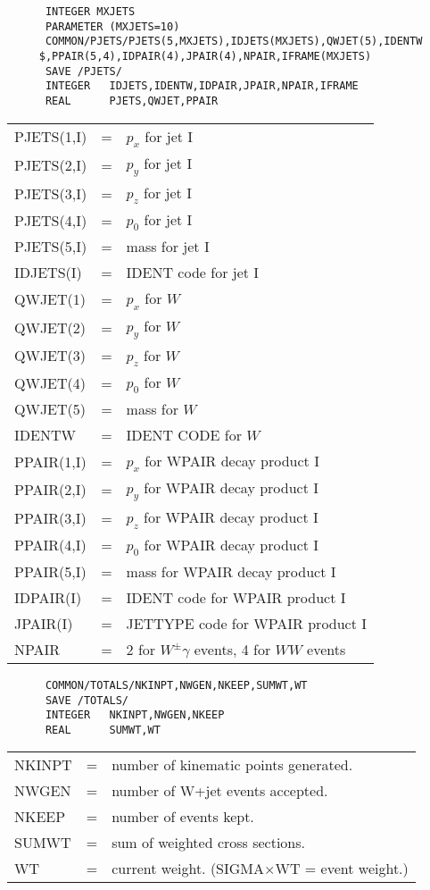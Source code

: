 \begin{verbatim}
      INTEGER MXJETS
      PARAMETER (MXJETS=10)
      COMMON/PJETS/PJETS(5,MXJETS),IDJETS(MXJETS),QWJET(5),IDENTW 
     $,PPAIR(5,4),IDPAIR(4),JPAIR(4),NPAIR,IFRAME(MXJETS)
      SAVE /PJETS/
      INTEGER   IDJETS,IDENTW,IDPAIR,JPAIR,NPAIR,IFRAME
      REAL      PJETS,QWJET,PPAIR
\end{verbatim}
\begin{tabular}{lcl}
PJETS(1,I)         &=& $p_x$ for jet I\\
PJETS(2,I)         &=& $p_y$ for jet I\\
PJETS(3,I)         &=& $p_z$ for jet I\\
PJETS(4,I)         &=& $p_0$ for jet I\\
PJETS(5,I)         &=& mass for jet I\\
IDJETS(I)          &=& IDENT code for jet I\\
QWJET(1)           &=& $p_x$ for $W$\\
QWJET(2)           &=& $p_y$ for $W$\\
QWJET(3)           &=& $p_z$ for $W$\\
QWJET(4)           &=& $p_0$ for $W$\\
QWJET(5)           &=& mass for $W$\\
IDENTW             &=& IDENT CODE for $W$\\
PPAIR(1,I)         &=& $p_x$ for WPAIR decay product I\\
PPAIR(2,I)         &=& $p_y$ for WPAIR decay product I\\
PPAIR(3,I)         &=& $p_z$ for WPAIR decay product I\\
PPAIR(4,I)         &=& $p_0$ for WPAIR decay product I\\
PPAIR(5,I)         &=& mass for WPAIR decay product I\\
IDPAIR(I)          &=& IDENT code for WPAIR product I\\
JPAIR(I)           &=& JETTYPE code for WPAIR product I\\
NPAIR              &=& 2 for $W^\pm\gamma$ events, 4 for $WW$ events\\
\end{tabular}

\begin{verbatim}
      COMMON/TOTALS/NKINPT,NWGEN,NKEEP,SUMWT,WT
      SAVE /TOTALS/
      INTEGER   NKINPT,NWGEN,NKEEP
      REAL      SUMWT,WT
\end{verbatim}
\begin{tabular}{lcl}
NKINPT             &=& number of kinematic points generated.\\
NWGEN              &=& number of W+jet events accepted.\\
NKEEP              &=& number of events kept.\\
SUMWT              &=& sum of weighted cross sections.\\
WT                 &=& current weight. (SIGMA$\times$WT = event weight.)\\
\end{tabular}

